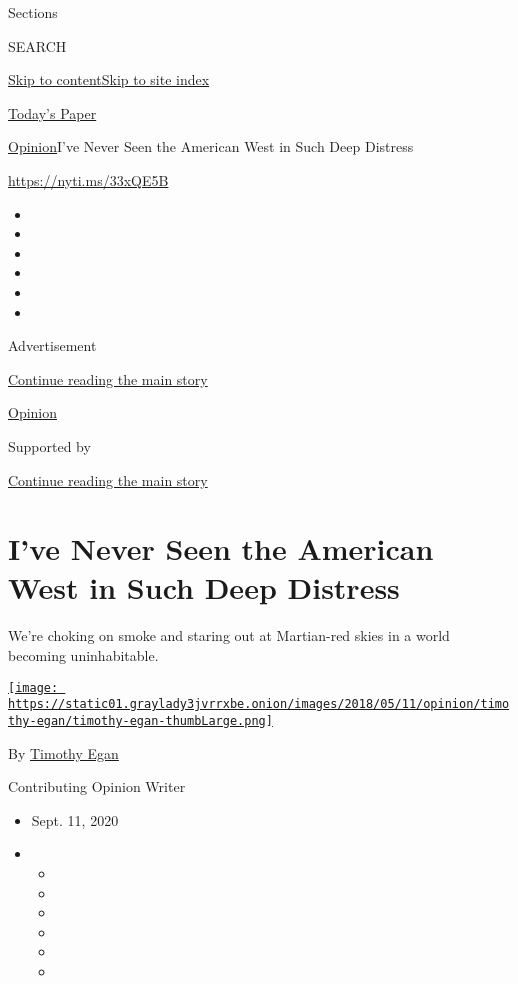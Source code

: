 Sections

SEARCH

\protect\hyperlink{site-content}{Skip to
content}\protect\hyperlink{site-index}{Skip to site index}

\href{https://myaccount.nytimes3xbfgragh.onion/auth/login?response_type=cookie\&client_id=vi}{}

\href{https://www.nytimes3xbfgragh.onion/section/todayspaper}{Today's
Paper}

\href{/section/opinion}{Opinion}\textbar{}I've Never Seen the American
West in Such Deep Distress

\url{https://nyti.ms/33xQE5B}

\begin{itemize}
\item
\item
\item
\item
\item
\item
\end{itemize}

Advertisement

\protect\hyperlink{after-top}{Continue reading the main story}

\href{/section/opinion}{Opinion}

Supported by

\protect\hyperlink{after-sponsor}{Continue reading the main story}

\hypertarget{ive-never-seen-the-american-west-in-such-deep-distress}{%
\section{I've Never Seen the American West in Such Deep
Distress}\label{ive-never-seen-the-american-west-in-such-deep-distress}}

We're choking on smoke and staring out at Martian-red skies in a world
becoming uninhabitable.

\href{https://www.nytimes3xbfgragh.onion/by/timothy-egan}{\texttt{[image: https://static01.graylady3jvrrxbe.onion/images/2018/05/11/opinion/timothy-egan/timothy-egan-thumbLarge.png]}}

By \href{https://www.nytimes3xbfgragh.onion/by/timothy-egan}{Timothy
Egan}

Contributing Opinion Writer

\begin{itemize}
\item
  Sept. 11, 2020
\item
  \begin{itemize}
  \item
  \item
  \item
  \item
  \item
  \item
  \end{itemize}
\end{itemize}

